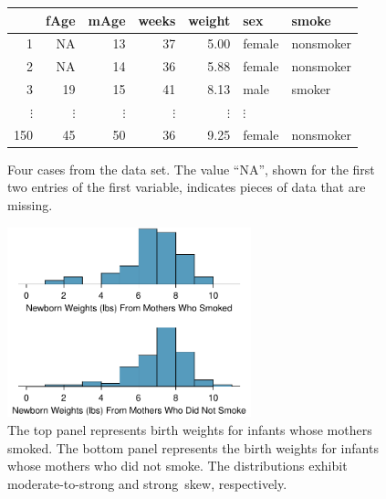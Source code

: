 \begin{figure}[h]
\centering
\begin{tabular}{rrrrrll}
  \hline
 & fAge & mAge & weeks & weight & sex & smoke \\ 
  \hline
1 & NA & 13 &  37 & 5.00 & female & nonsmoker \\ 
  2 & NA & 14 &  36 & 5.88 & female & nonsmoker \\ 
  3 & 19 & 15 &  41 & 8.13 & male & smoker \\ 
  $\vdots$ &   $\vdots$ &   $\vdots$ &   $\vdots$ &   $\vdots$ &   $\vdots$ \\
  150 & 45 & 50 &  36 & 9.25 & female & nonsmoker \\ 
   \hline
\end{tabular}
\caption{Four cases from the  data set. The value ``NA'', shown for the first two entries of the first variable, indicates pieces of data that are missing.}
\label{babySmokeDF}
\end{figure}

\begin{figure}[hhh]
\centering
\includegraphics[width=0.63\textwidth]{ch_inference_for_means/figures/babySmokePlotOfTwoGroupsToExamineSkew/babySmokePlotOfTwoGroupsToExamineSkew}
\caption{The top panel represents birth weights for infants whose mothers smoked. The bottom panel represents the birth weights for infants whose mothers who did not smoke. The distributions exhibit moderate-to-strong and strong~skew, respectively.}
\label{babySmokePlotOfTwoGroupsToExamineSkew}
\end{figure}

\D{\newpage}

